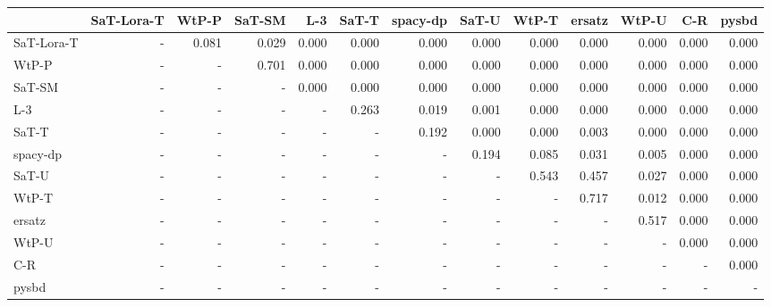 \begin{tabular}{lrrrrrrrrrrrr}
\toprule
 & SaT-Lora-T & WtP-P & SaT-SM & L-3 & SaT-T & spacy-dp & SaT-U & WtP-T & ersatz & WtP-U & C-R & pysbd \\
\midrule
SaT-Lora-T & - & 0.081 & 0.029 & 0.000 & 0.000 & 0.000 & 0.000 & 0.000 & 0.000 & 0.000 & 0.000 & 0.000 \\
WtP-P & - & - & 0.701 & 0.000 & 0.000 & 0.000 & 0.000 & 0.000 & 0.000 & 0.000 & 0.000 & 0.000 \\
SaT-SM & - & - & - & 0.000 & 0.000 & 0.000 & 0.000 & 0.000 & 0.000 & 0.000 & 0.000 & 0.000 \\
L-3 & - & - & - & - & 0.263 & 0.019 & 0.001 & 0.000 & 0.000 & 0.000 & 0.000 & 0.000 \\
SaT-T & - & - & - & - & - & 0.192 & 0.000 & 0.000 & 0.003 & 0.000 & 0.000 & 0.000 \\
spacy-dp & - & - & - & - & - & - & 0.194 & 0.085 & 0.031 & 0.005 & 0.000 & 0.000 \\
SaT-U & - & - & - & - & - & - & - & 0.543 & 0.457 & 0.027 & 0.000 & 0.000 \\
WtP-T & - & - & - & - & - & - & - & - & 0.717 & 0.012 & 0.000 & 0.000 \\
ersatz & - & - & - & - & - & - & - & - & - & 0.517 & 0.000 & 0.000 \\
WtP-U & - & - & - & - & - & - & - & - & - & - & 0.000 & 0.000 \\
C-R & - & - & - & - & - & - & - & - & - & - & - & 0.000 \\
pysbd & - & - & - & - & - & - & - & - & - & - & - & - \\
\bottomrule
\end{tabular}

